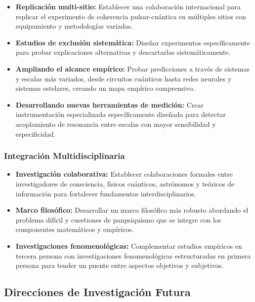 \documentclass[12pt]{article}
\begin{document}
\begin{itemize}
    \item \textbf{Replicación multi-sitio:} Establecer una colaboración internacional para replicar el experimento de coherencia pulsar-cuántica en múltiples sitios con equipamiento y metodologías variadas.
    
    \item \textbf{Estudios de exclusión sistemática:} Diseñar experimentos específicamente para probar explicaciones alternativas y descartarlas sistemáticamente.
    
    \item \textbf{Ampliando el alcance empírico:} Probar predicciones a través de sistemas y escalas más variados, desde circuitos cuánticos hasta redes neurales y sistemas estelares, creando un mapa empírico comprensivo.
    
    \item \textbf{Desarrollando nuevas herramientas de medición:} Crear instrumentación especializada específicamente diseñada para detectar acoplamiento de resonancia entre escalas con mayor sensibilidad y especificidad.
\end{itemize}

\subsubsection{Integración Multidisciplinaria}

\begin{itemize}
    \item \textbf{Investigación colaborativa:} Establecer colaboraciones formales entre investigadores de consciencia, físicos cuánticos, astrónomos y teóricos de información para fortalecer fundamentos interdisciplinarios.
    
    \item \textbf{Marco filosófico:} Desarrollar un marco filosófico más robusto abordando el problema difícil y cuestiones de panpsiquismo que se integre con los componentes matemáticos y empíricos.
    
    \item \textbf{Investigaciones fenomenológicas:} Complementar estudios empíricos en tercera persona con investigaciones fenomenológicas estructuradas en primera persona para tender un puente entre aspectos objetivos y subjetivos.
\end{itemize}

\subsection{Direcciones de Investigación Futura}
\end{document}
